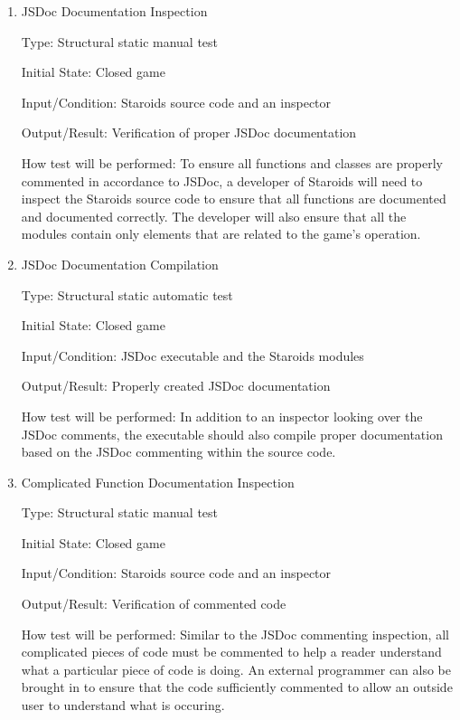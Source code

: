 \documentclass[12pt, titlepage]{article}
\begin{document}
\begin{enumerate}

\item{JSDoc Documentation Inspection\\}

Type: Structural static manual test

Initial State: Closed game

Input/Condition: Staroids source code and an inspector

Output/Result: Verification of proper JSDoc documentation

How test will be performed: To ensure all functions and classes are properly commented in accordance to JSDoc, a developer of Staroids will need to inspect the Staroids source code to ensure that all functions are documented and documented correctly. The developer will also ensure that all the modules contain only elements that are related to the game's operation.

\item{JSDoc Documentation Compilation\\}

Type: Structural static automatic test

Initial State: Closed game

Input/Condition: JSDoc executable and the Staroids modules

Output/Result: Properly created JSDoc documentation

How test will be performed: In addition to an inspector looking over the JSDoc comments, the executable should also compile proper documentation based on the JSDoc commenting within the source code.

\item{Complicated Function Documentation Inspection\\}

Type: Structural static manual test

Initial State: Closed game

Input/Condition: Staroids source code and an inspector

Output/Result: Verification of commented code

How test will be performed: Similar to the JSDoc commenting inspection, all complicated pieces of code must be commented to help a reader understand what a particular piece of code is doing. An external programmer can also be brought in to ensure that the code sufficiently commented to allow an outside user to understand what is occuring.

\end{enumerate}
\end{document}
